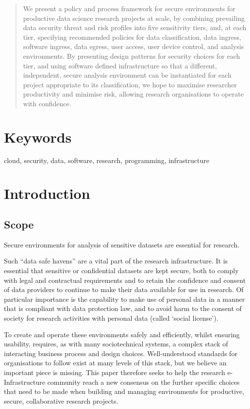 \documentclass[10pt,a4paper,twocolumn]{article}
\begin{document}
\begin{abstract}

We present a policy and process framework for secure environments for productive data science research projects at scale, by combining prevailing data security threat and risk profiles into five sensitivity tiers, and, at each tier, specifying recommended policies for data classification, data ingress, software ingress, data egress, user access, user device control, and analysis environments.
By presenting design patterns for security choices for each tier, and using software defined infrastructure so that a different, independent, secure analysis environment can be instantiated for each project appropriate to its classification, we hope to maximise researcher productivity and minimise risk, allowing research organisations to operate with confidence.


\end{abstract}

\section*{Keywords}

cloud, security, data, software, research, programming, infrastructure

\clearpage

\section{Introduction}

\subsection{Scope}

Secure environments for analysis of sensitive datasets are essential for research.

Such ``data safe havens'' are a vital part of the research infrastructure.
It is essential that sensitive or confidential datasets are kept secure, both to comply with legal and contractual requirements and to retain the confidence and consent of data providers to continue to make their data available for use in research. Of particular importance is the capability to make use of personal data in a manner that is compliant with data protection law, 
and to avoid harm to the consent of society for research activities with personal data (called `social license').

To create and operate these environments safely and efficiently, whilst ensuring usability, requires, as with many sociotechnical systems, a complex stack of interacting 
business process and design choices. Well-understood standards for organisations to follow 
exist at many levels of this stack, but we believe an important piece is missing. This paper therefore seeks to help the research e-Infrastructure community reach a new consensus on the further specific choices that need to be made when building and managing environments for productive, secure, collaborative research projects.
\end{document}

